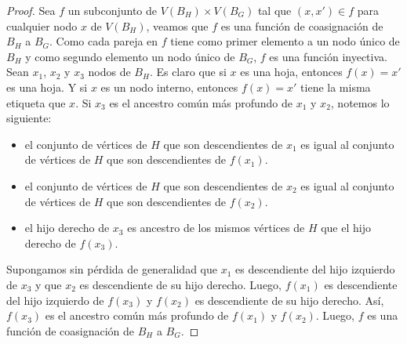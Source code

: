 \begin{proof}
Sea $f$ un subconjunto de $V(B_H) \times V(B_G)$ tal que $(x,x')\in f$ para cualquier nodo $x$ de $V(B_H)$, veamos que $f$ es una función de coasignación de $B_H$ a $B_G$. Como cada pareja en $f$ tiene como primer elemento a un nodo único de $B_H$ y como segundo elemento un nodo único de $B_G$, $f$ es una función inyectiva. Sean $x_1$, $x_2$ y $x_3$ nodos de $B_H$. Es claro que si $x$ es una hoja, entonces $f(x)=x'$ es una hoja. Y si $x$ es un nodo interno, entonces $f(x)=x'$ tiene la misma etiqueta que $x$. Si $x_3$ es el ancestro común más profundo de $x_1$ y $x_2$, notemos lo siguiente:
\begin{itemize}
    \item el conjunto de vértices de $H$ que son descendientes de $x_1$ es igual al conjunto de vértices de $H$ que son descendientes de $f(x_1)$.
    \item el conjunto de vértices de $H$ que son descendientes de $x_2$ es igual al conjunto de vértices de $H$ que son descendientes de $f(x_2)$.
    \item el hijo derecho de $x_3$ es ancestro de los mismos vértices de $H$ que el hijo derecho de $f(x_3)$.
\end{itemize}
Supongamos sin pérdida de generalidad que $x_1$ es descendiente del hijo izquierdo de $x_3$ y que $x_2$ es descendiente de su hijo derecho. Luego,  $f(x_1)$ es descendiente del hijo izquierdo de $f(x_3)$ y $f(x_2)$ es descendiente de su hijo derecho. Así, $f(x_3)$ es el ancestro común más profundo de $f(x_1)$ y $f(x_2)$. Luego, $f$ es una función de coasignación de $B_H$ a $B_G$.

\end{proof}